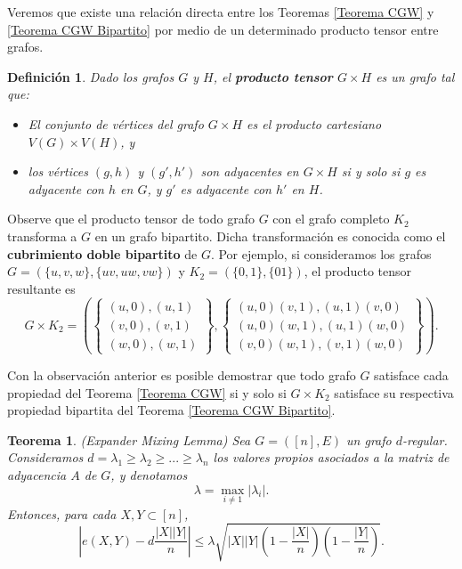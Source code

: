 \documentclass{article}[14pts]
\newtheorem{teorema}{Teorema}
\newtheorem{definicion}{Definición}
\begin{document}
Veremos que existe una relación directa entre los Teoremas \ref{Teorema CGW} y \ref{Teorema CGW Bipartito} por medio de un determinado producto tensor entre grafos.\medskip

\begin{definicion}
    Dado los grafos $G$ y $H$, el \textbf{producto tensor} $G\times H$ es un grafo tal que:
    \begin{itemize}
        \item[i)] El conjunto de vértices del grafo $G\times H$ es el producto cartesiano $V(G)\times V(H)$, y
        \item[ii)] los vértices $(g,h)$ y $(g',h')$ son adyacentes en $G\times H$ si y solo si $g$ es adyacente con $h$ en $G$, y $g'$ es adyacente con $h'$ en $H$.
    \end{itemize}
\end{definicion}\medskip

Observe que el producto tensor de todo grafo $G$ con el grafo completo $K_2$ transforma a $G$ en un grafo bipartito. Dicha transformación es conocida como el \textbf{cubrimiento doble bipartito} de $G$. Por ejemplo, si consideramos los grafos $G = (\lbrace u,v,w\rbrace, \lbrace uv, uw, vw\rbrace)$ y $K_2 = (\lbrace 0,1\rbrace, \lbrace 01\rbrace)$, el producto tensor resultante es\medskip
\begin{equation*}
    G\times K_2 = \left(
    \left\lbrace
        \begin{array}{c}
             (u,0) , (u,1)\\
             (v,0) , (v,1)\\
             (w,0) , (w,1)
        \end{array}
    \right\rbrace,
    \left\lbrace
        \begin{array}{c}
            (u,0)(v,1) , (u,1)(v,0)\\
            (u,0)(w,1) , (u,1)(w,0)\\
            (v,0)(w,1) , (v,1)(w,0)
        \end{array}
    \right\rbrace
    \right).
\end{equation*}\medskip

Con la observación anterior es posible demostrar que todo grafo $G$ satisface cada propiedad del Teorema \ref{Teorema CGW} si y solo si $G\times K_2$ satisface su respectiva propiedad bipartita del Teorema \ref{Teorema CGW Bipartito}.


\begin{teorema} \label{Expander Mixing Lemma} (Expander Mixing Lemma)
    Sea $G = ([n], E)$ un grafo $d$-regular. Consideramos $d=\lambda_1 \geq \lambda_2\geq...\geq\lambda_n$ los valores propios asociados a la matriz de adyacencia $A$ de $G$, y denotamos
    \[
        \lambda = \max_{i\not= 1}|\lambda_i|.
    \]
    Entonces, para cada $X,Y\subset [n]$,
    \begin{equation} \label{resultado EML}
        \left| e(X,Y) - d\frac{|X||Y|}{n}\right| \leq \lambda \sqrt{|X||Y|\left( 1 - \frac{|X|}{n}\right)\left( 1 - \frac{|Y|}{n}\right)}.
    \end{equation}
\end{teorema}
\end{document}
